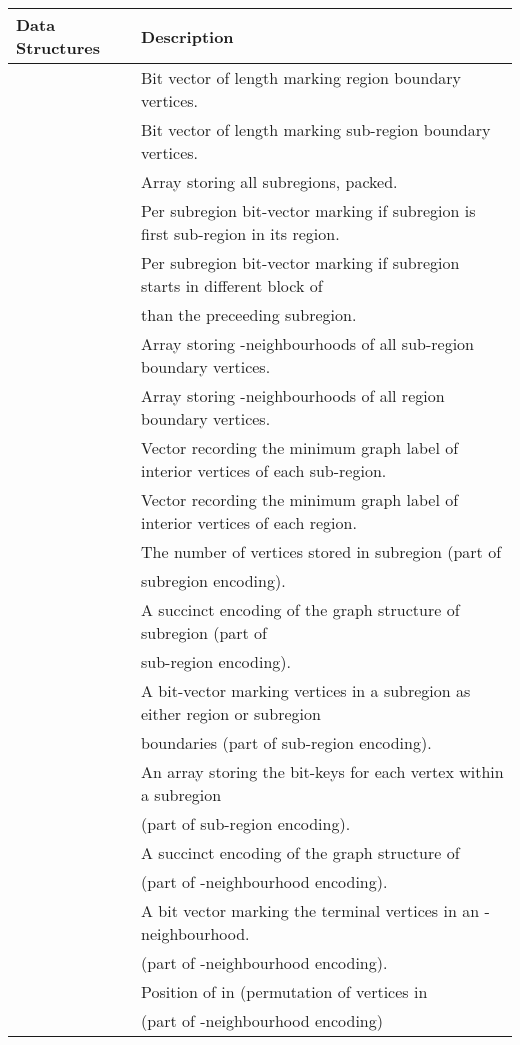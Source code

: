 \begin{table}[H]
	\centering
		\begin{tabular}{ l | l}
			Data Structures & Description \\ \hline
			 & Bit vector of length  marking region boundary vertices. \\
			 & Bit vector of length  marking sub-region boundary vertices. \\
			 & Array storing all subregions, packed. \\
			 & Per subregion bit-vector marking if subregion is first sub-region in its region. \\
			 & Per subregion bit-vector marking if subregion starts in different block of  \\
			& than the preceeding subregion. \\
			 & Array storing -neighbourhoods of all sub-region boundary vertices. \\
			 & Array storing -neighbourhoods of all region boundary vertices. \\
			 & Vector recording the minimum graph label of interior vertices of each sub-region. \\
			 & Vector recording the minimum graph label of interior vertices of each region. \\
			 & The number of vertices stored in subregion  (part of  \\
			 & subregion encoding).\\
			 & A succinct encoding of the graph structure of subregion  (part of  \\
			 & sub-region encoding).\\
			 & A bit-vector marking vertices in a subregion as either region or subregion \\
			& boundaries (part of sub-region encoding).\\
			 & An array storing the  bit-keys for each vertex within a subregion \\
			 & (part of sub-region encoding). \\
			 & A succinct encoding of the graph structure of  \\
			 & (part of -neighbourhood encoding).\\
			 & A bit vector marking the terminal vertices in an  -neighbourhood. \\
			 & (part of -neighbourhood encoding). \\
			 & Position of  in  (permutation of vertices in \\
			 & (part of -neighbourhood encoding) \\

\end{tabular}
\end{table}
